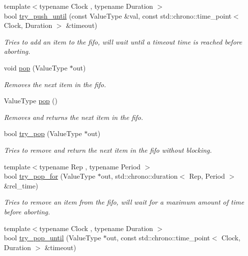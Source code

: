 \begin{DoxyCompactItemize}
{\footnotesize template$<$typename Clock , typename Duration $>$ }\\bool \hyperlink{classcpen333_1_1thread_1_1fifo_a988118f0498b8c1f76dcb417d7eb6fd2}{try\+\_\+push\+\_\+until} (const Value\+Type \&val, const std\+::chrono\+::time\+\_\+point$<$ Clock, Duration $>$ \&timeout)
\begin{DoxyCompactList}\small\item\em Tries to add an item to the fifo, will wait until a timeout time is reached before aborting. \end{DoxyCompactList}\item 
void \hyperlink{classcpen333_1_1thread_1_1fifo_a501e527a9036433e38aac51b5e0726ae}{pop} (Value\+Type $\ast$out)
\begin{DoxyCompactList}\small\item\em Removes the next item in the fifo. \end{DoxyCompactList}\item 
Value\+Type \hyperlink{classcpen333_1_1thread_1_1fifo_a87f35e103028525f9c1c65c3767548fd}{pop} ()
\begin{DoxyCompactList}\small\item\em Removes and returns the next item in the fifo. \end{DoxyCompactList}\item 
bool \hyperlink{classcpen333_1_1thread_1_1fifo_abca6f4c05b7697b05eccac2d269613bf}{try\+\_\+pop} (Value\+Type $\ast$out)
\begin{DoxyCompactList}\small\item\em Tries to remove and return the next item in the fifo without blocking. \end{DoxyCompactList}\item 
{\footnotesize template$<$typename Rep , typename Period $>$ }\\bool \hyperlink{classcpen333_1_1thread_1_1fifo_a85e70436c2515d348908d37e730eb7ce}{try\+\_\+pop\+\_\+for} (Value\+Type $\ast$out, std\+::chrono\+::duration$<$ Rep, Period $>$ \&rel\+\_\+time)
\begin{DoxyCompactList}\small\item\em Tries to remove an item from the fifo, will wait for a maximum amount of time before aborting. \end{DoxyCompactList}\item 
{\footnotesize template$<$typename Clock , typename Duration $>$ }\\bool \hyperlink{classcpen333_1_1thread_1_1fifo_a72226dbbb37d6ff4690d56d769aa934e}{try\+\_\+pop\+\_\+until} (Value\+Type $\ast$out, const std\+::chrono\+::time\+\_\+point$<$ Clock, Duration $>$ \&timeout)

\end{DoxyCompactItemize}

